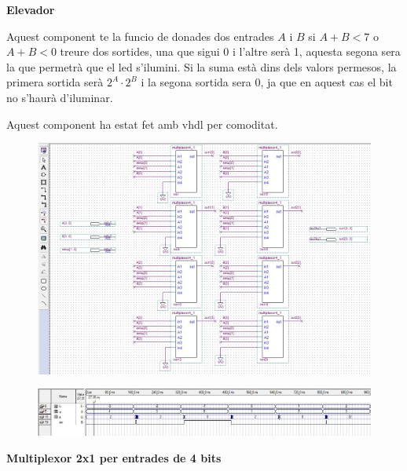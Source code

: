 \documentclass[12pt, a4papre]{article}
\begin{document}
\begin{center}
	\textbf{\large{Elevador}}
	
	Aquest component te la funcio de donades dos entrades $A$ i $B$ si $A + B < 7$ o $A + B  < 0$ treure dos sortides, una que sigui 0 i l'altre serà 1, aquesta segona sera la que permetrà que el led s'ilumini. Si la suma està dins dels valors permesos, la primera sortida serà $2^A\cdot2^B$ i la segona sortida sera 0, ja que en aquest cas el bit no s'haurà d'iluminar.
	
	Aquest component ha estat fet amb vhdl per comoditat.
	
	\begin{center}
	\begin{figure}[H]
		\begin{center}
		\includegraphics[width=150mm]{selectormult.jpeg}
		\end{center}
	\end{figure}
	\end{center}
	\begin{center}
	\begin{figure}[H]
		\begin{center}
		\includegraphics[width=150mm]{simuladoraelevador.jpeg}
		\end{center}
	\end{figure}
	\end{center}
	
	\textbf{\large{Multiplexor 2x1 per entrades de 4 bits}}
	

\end{center}
\end{document}
